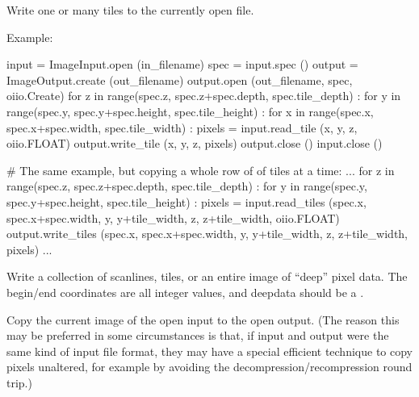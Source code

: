 
Write one or many tiles to the currently open file.

\noindent Example:
\begin{code}
    input = ImageInput.open (in_filename)
    spec = input.spec ()
    output = ImageOutput.create (out_filename)
    output.open (out_filename, spec, oiio.Create)
    for z in range(spec.z, spec.z+spec.depth, spec.tile_depth) :
        for y in range(spec.y, spec.y+spec.height, spec.tile_height) :
            for x in range(spec.x, spec.x+spec.width, spec.tile_width) :
                pixels = input.read_tile (x, y, z, oiio.FLOAT)
                output.write_tile (x, y, z, pixels)
    output.close ()
    input.close ()

    # The same example, but copying a whole row of of tiles at a time:
    ...
    for z in range(spec.z, spec.z+spec.depth, spec.tile_depth) :
        for y in range(spec.y, spec.y+spec.height, spec.tile_height) :
            pixels = input.read_tiles (spec.x, spec.x+spec.width,
                                       y, y+tile_width,
                                       z, z+tile_width, oiio.FLOAT)
            output.write_tiles (spec.x, spec.x+spec.width,
                                y, y+tile_width, z, z+tile_width, pixels)
    ...
\end{code}
\apiend


Write a collection of scanlines, tiles, or an entire image of ``deep''
pixel data. The begin/end coordinates are all integer values, and
{\cf deepdata} should be a \DeepData.
\apiend

Copy the current image of the open input to the open output. (The reason
this may be preferred in some circumstances is that, if input and
output were the same kind of input file format, they may have a special
efficient technique to copy pixels unaltered, for example by avoiding the 
decompression/recompression round trip.)

